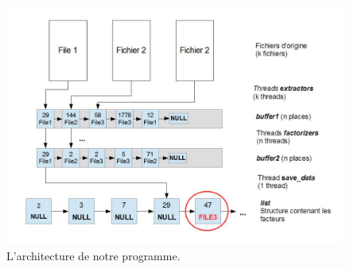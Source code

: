 \documentclass{article}
\begin{document}
\begin{figure}[ht]
	\centering
	\includegraphics[scale=0.3]{img/arch.jpg}
	\caption{L'architecture de notre programme.}
	\label{fig:arch}
\end{figure}
\end{document}
